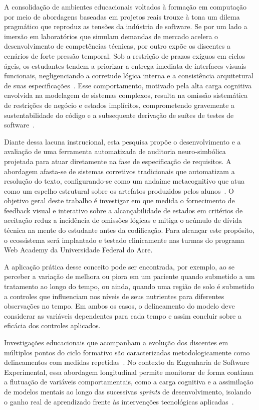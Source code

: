 \documentclass[ruledheader]{abnt_UFF}[abntex2]
\begin{document}
A consolidação de ambientes educacionais voltados à formação em computação por meio de abordagens baseadas em projetos reais trouxe à tona um dilema pragmático que reproduz as tensões da indústria de software. Se por um lado a imersão em laboratórios que simulam demandas de mercado acelera o desenvolvimento de competências técnicas, por outro expõe os discentes a cenários de forte pressão temporal. Sob a restrição de prazos exíguos em ciclos ágeis, os estudantes tendem a priorizar a entrega imediata de interfaces visuais funcionais, negligenciando a corretude lógica interna e a consistência arquitetural de suas especificações~\cite{gilal2023key}. Esse comportamento, motivado pela alta carga cognitiva envolvida na modelagem de sistemas complexos, resulta na omissão sistemática de restrições de negócio e estados implícitos, comprometendo gravemente a sustentabilidade do código e a subsequente derivação de suítes de testes de software~\cite{salman2023confirmation}.

Diante dessa lacuna instrucional, esta pesquisa propõe o desenvolvimento e a avaliação de uma ferramenta automatizada de auditoria neuro-simbólica projetada para atuar diretamente na fase de especificação de requisitos. A abordagem afasta-se de sistemas corretivos tradicionais que automatizam a resolução do texto, configurando-se como um andaime metacognitivo que atua como um espelho estrutural sobre os artefatos produzidos pelos alunos~\cite{santiago2023proposta}. O objetivo geral deste trabalho é investigar em que medida o fornecimento de feedback visual e interativo sobre a alcançabilidade de estados em critérios de aceitação reduz a incidência de omissões lógicas e mitiga o acúmulo de dívida técnica na mente do estudante antes da codificação. Para alcançar este propósito, o ecossistema será implantado e testado clinicamente nas turmas do programa Web Academy da Universidade Federal do Acre.
 

 

A aplicação prática desse conceito pode ser encontrada, por exemplo, ao se perceber a variação de melhora ou piora em um paciente quando submetido a um tratamento ao longo do tempo, ou ainda, quando uma região de solo é submetido a controles que influenciam nos níveis de seus nutrientes para diferentes observações no tempo. Em ambos os casos, o delineamento do modelo deve considerar as variáveis dependentes para cada tempo e assim concluir sobre a eficácia dos controles aplicados.


Investigações educacionais que acompanham a evolução dos discentes em múltiplos pontos do ciclo formativo são caracterizadas metodologicamente como delineamentos com medidas repetidas~\cite{campbell1963experimental}. No contexto da Engenharia de Software Experimental, essa abordagem longitudinal permite monitorar de forma contínua a flutuação de variáveis comportamentais, como a carga cognitiva e a assimilação de modelos mentais ao longo das sucessivas \textit{sprints} de desenvolvimento, isolando o ganho real de aprendizado frente às intervenções tecnológicas aplicadas~\cite{wohlin2012experimentation}.  
\end{document}
